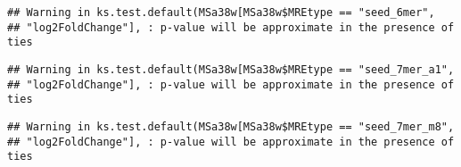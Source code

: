\documentclass[
]{article}
\newenvironment{Shaded}{\begin{snugshade}}{\end{snugshade}}
\newcommand{\FunctionTok}[1]{\textcolor[rgb]{0.13,0.29,0.53}{\textbf{#1}}}
\newcommand{\NormalTok}[1]{#1}
\newcommand{\OtherTok}[1]{\textcolor[rgb]{0.56,0.35,0.01}{#1}}
\newcommand{\SpecialCharTok}[1]{\textcolor[rgb]{0.81,0.36,0.00}{\textbf{#1}}}
\newcommand{\StringTok}[1]{\textcolor[rgb]{0.31,0.60,0.02}{#1}}
\begin{document}
\begin{verbatim}
## Warning in ks.test.default(MSa38w[MSa38w$MREtype == "seed_6mer",
## "log2FoldChange"], : p-value will be approximate in the presence of ties
\end{verbatim}

\begin{Shaded}
\end{Shaded}

\begin{verbatim}
## Warning in ks.test.default(MSa38w[MSa38w$MREtype == "seed_7mer_a1",
## "log2FoldChange"], : p-value will be approximate in the presence of ties
\end{verbatim}

\begin{Shaded}
\end{Shaded}

\begin{verbatim}
## Warning in ks.test.default(MSa38w[MSa38w$MREtype == "seed_7mer_m8",
## "log2FoldChange"], : p-value will be approximate in the presence of ties
\end{verbatim}

\begin{Shaded}
\end{Shaded}
\end{document}
